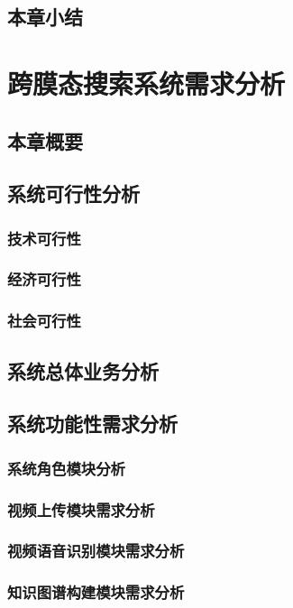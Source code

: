 \documentclass[12pt,a4paper,fancyhdr,openany,oneside]{ctexbook}
\begin{document}
\section{本章小结}



\chapter{跨膜态搜索系统需求分析}
\section{本章概要}
\section{系统可行性分析}
\subsection{技术可行性}
\subsection{经济可行性}
\subsection{社会可行性}



\section{系统总体业务分析}

\section{系统功能性需求分析}
\subsection{系统角色模块分析}
\subsection{视频上传模块需求分析}
\subsection{视频语音识别模块需求分析}
\subsection{知识图谱构建模块需求分析}
\end{document}
